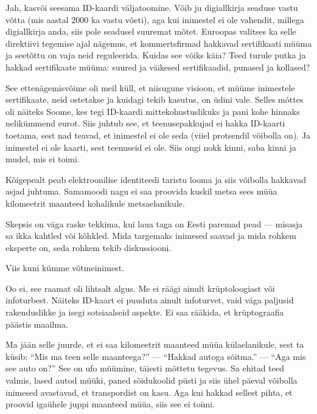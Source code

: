 Jah, kasvõi seesama ID-kaardi väljatoomine. Võib ju digiallkirja seaduse vastu 
võtta (mis aastal 2000 ka vastu võeti), aga kui inimestel ei ole vahendit, 
millega digiallkirja anda, siis pole seadusel suuremat mõtet. 
Euroopas valitses ka selle direktiivi tegemise ajal nägemus, et 
kommertsfirmad hakkavad sertifikaati müüma ja seetõttu on vaja neid 
reguleerida. Kuidas see võiks käia? Teed turule putka ja hakkad sertifikaate 
müüma: suured ja väikesed sertifikaadid, punased ja kollased? 

See ettenägemisvõime oli meil küll, et niisugune visioon, et müüme inimestele 
sertifikaate, neid ostetakse ja kuidagi tekib kasutus, on üdini vale. Selles mõttes oli näiteks Soome, kes tegi ID-kaardi 
mittekohustuslikuks ja pani kohe hinnaks nelikümmend eurot. Siis juhtub see, et teenusepakkujad ei hakka ID-kaarti toetama, sest 
nad teavad, et inimestel ei ole seda (viiel protsendil võibolla on). Ja inimestel ei ole kaarti, sest teenuseid ei 
ole. Siis ongi nokk kinni, saba kinni ja mudel, mis ei toimi. 

Kõigepealt peab elektroonilise identiteedi 
taristu looma ja siis võibolla hakkavad asjad juhtuma. Samamoodi nagu ei 
saa proovida kuskil metsa sees müüa kilomeetrit maanteed kohalikule 
metsaelanikule. 


Skepsis on väga raske tekkima, kui laua taga on Eesti paremad pead --- misasja sa ikka kahtled või kõhkled. Mida targemaks inimesed saavad ja 
mida rohkem eksperte on, seda rohkem tekib diskussiooni. 


Viis kuni kümme võtmeinimest.


Oo ei, see raamat oli lihtsalt algus. Me ei räägi ainult 
krüptoloogiast või infoturbest. Näiteks ID-kaart ei puuduta ainult 
infoturvet, vaid väga paljusid rakenduslikke ja isegi sotsiaalseid aspekte. Ei saa rääkida, et krüptograafia päästis maailma. 


Ma jään selle juurde, et ei saa kilomeetrit maanteed müüa 
külaelanikule, sest ta küsib: \enquote{Mis ma teen selle maanteega?} --- 
\enquote{Hakkad autoga sõitma.} --- \enquote{Aga mis see auto on?} See on 
ufo müümine, täiesti mõttetu tegevus. Sa ehitad teed valmis, lased autod müüki, 
paned sõidukoolid püsti ja siis ühel päeval võibolla inimesed avastavad, et 
transpordist on kasu. Aga kui hakkad sellest pihta, et proovid 
igaühele juppi maanteed müüa, siis see ei toimi. 

